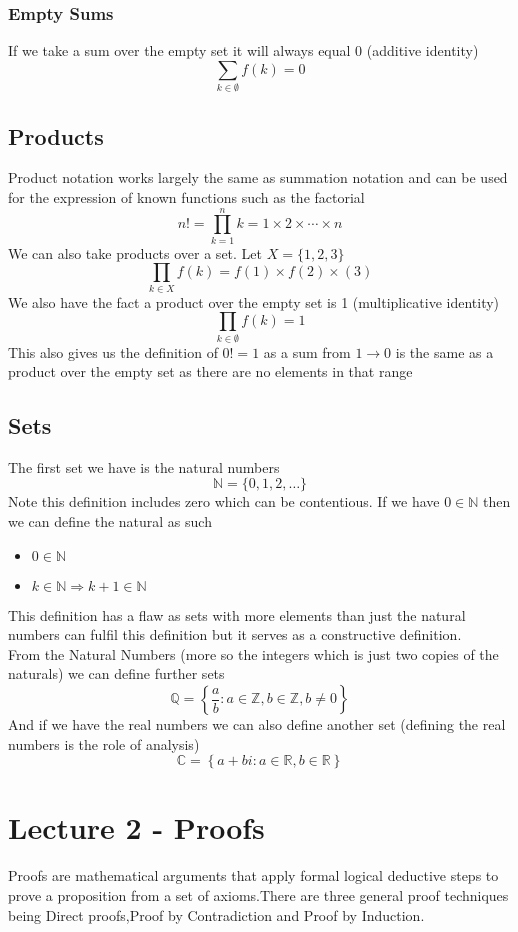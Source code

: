 \documentclass{article}
\begin{document}
\subsubsection{Empty Sums}
If we take a sum over the empty set it will always equal 0 (additive identity)
\[\sum_{k \in \emptyset}f(k) = 0\]
\subsection{Products}
Product notation works largely the same as summation notation and can be used for the expression of known functions such as the factorial
\[n! = \prod_{k = 1}^{n}k = 1 \times 2 \times \cdots \times n\]
We can also take products over a set. Let $X = \{1,2,3\}$
\[\prod_{k \in X}f(k) = f(1) \times f(2) \times (3)\]
We also have the fact a product over the empty set is 1 (multiplicative identity)
\[\prod_{k \in \emptyset}f(k) = 1\]
This also gives us the definition of $0! = 1$ as a sum from $1 \to 0$ is the same as a product over the empty set as there are no elements in that range
\subsection{Sets}
The first set we have is the natural numbers
\[\mathbb{N} = \{0,1,2,\dots\}\]
Note this definition includes zero which can be contentious. If we have $0 \in  \mathbb{N}$ then we can define the natural as such
\begin{itemize}
    \item $0 \in \mathbb{N}$
    \item $k \in \mathbb{N} \Rightarrow k + 1 \in \mathbb{N}$
\end{itemize}
This definition has a flaw as sets with more elements than just the natural numbers can fulfil this definition but it serves as a constructive definition.
\\
From the Natural Numbers (more so the integers which is just two copies of the naturals) we can define further sets
\[\mathbb{Q} = \left\{\frac{a}{b} : a \in \mathbb{Z},b \in \mathbb{Z},b \ne 0\right\}\]
And if we have the real numbers we can also define another set (defining the real numbers is the role of analysis)
\[\mathbb{C} = \left\{a + bi : a \in \mathbb{R},b \in \mathbb{R}\right\}\]
\section{Lecture 2 - Proofs}
\newtheorem{proposition}{Proposition}
Proofs are mathematical arguments that apply formal logical deductive steps to prove a proposition from a set of axioms.There are three general proof techniques being Direct proofs,Proof by Contradiction and Proof by Induction.
\end{document}
